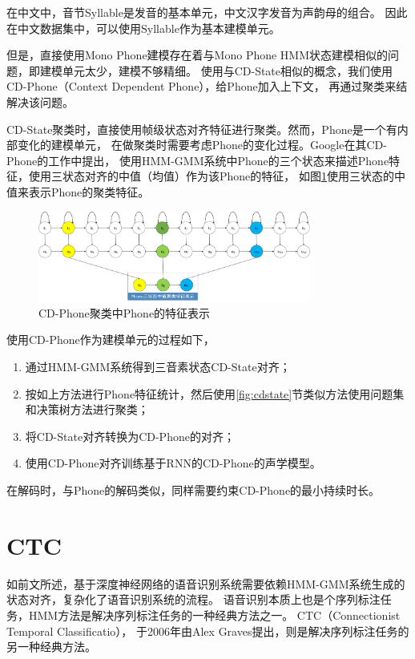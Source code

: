 在中文中，音节Syllable是发音的基本单元，中文汉字发音为声韵母的组合。
因此在中文数据集中，可以使用Syllable作为基本建模单元。

但是，直接使用Mono Phone建模存在着与Mono Phone HMM状态建模相似的问题，即建模单元太少，建模不够精细。
使用与CD-State相似的概念，我们使用CD-Phone（Context Dependent Phone），给Phone加入上下文，
再通过聚类来结解决该问题。

CD-State聚类时，直接使用帧级状态对齐特征进行聚类。然而，Phone是一个有内部变化的建模单元，
在做聚类时需要考虑Phone的变化过程。Google在其CD-Phone的工作中提出，
使用HMM-GMM系统中Phone的三个状态来描述Phone特征，使用三状态对齐的中值（均值）作为该Phone的特征，
如图\ref{fig:3middle}使用三状态的中值来表示Phone的聚类特征。

\begin{figure}[htbp]
\centering
\includegraphics[width=0.8\textwidth]{figures/chapter4/3middle-crop}
\caption{CD-Phone聚类中Phone的特征表示}
\label{fig:3middle}
\end{figure}


使用CD-Phone作为建模单元的过程如下，
\begin{enumerate}
\item 通过HMM-GMM系统得到三音素状态CD-State对齐；
\item 按如上方法进行Phone特征统计，然后使用\ref{fig:cdstate}节类似方法使用问题集和决策树方法进行聚类；
\item 将CD-State对齐转换为CD-Phone的对齐；
\item 使用CD-Phone对齐训练基于RNN的CD-Phone的声学模型。
\end{enumerate}
在解码时，与Phone的解码类似，同样需要约束CD-Phone的最小持续时长。


\section{CTC}

如前文所述，基于深度神经网络的语音识别系统需要依赖HMM-GMM系统生成的状态对齐，复杂化了语音识别系统的流程。
语音识别本质上也是个序列标注任务，HMM方法是解决序列标注任务的一种经典方法之一。
CTC（Connectionist Temporal Classificatio），
于2006年由Alex Graves提出，则是解决序列标注任务的另一种经典方法。

